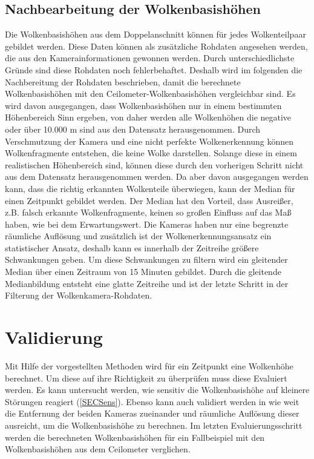 \documentclass[a4paper,11pt,twoside,german]{article}
\newcommand{\absatz}{\smallbreak}
\begin{document}
\subsection{Nachbearbeitung der Wolkenbasishöhen}
\label{SECHeightPost}
Die Wolkenbasishöhen aus dem Doppelanschnitt können für jedes Wolkenteilpaar gebildet werden. Diese Daten können als zusätzliche Rohdaten angesehen werden, die aus den Kamerainformationen gewonnen werden. Durch unterschiedlichste Gründe sind diese Rohdaten noch fehlerbehaftet. Deshalb wird im folgenden die Nachbereitung der Rohdaten beschrieben, damit die berechnete Wolkenbasishöhen mit den Ceilometer-Wolkenbasishöhen vergleichbar sind.\absatz
Es wird davon ausgegangen, dass Wolkenbasishöhen nur in einem bestimmten Höhenbereich Sinn ergeben, von daher werden alle Wolkenhöhen die negative oder über 10.000 m sind aus den Datensatz herausgenommen.\absatz
Durch Verschmutzung der Kamera und eine nicht perfekte Wolkenerkennung können Wolkenfragmente entstehen, die keine Wolke darstellen. Solange diese in einem realistischen Höhenbereich sind, können diese durch den vorherigen Schritt nicht aus dem Datensatz herausgenommen werden. Da aber davon ausgegangen werden kann, dass die richtig erkannten Wolkenteile überwiegen, kann der Median für einen Zeitpunkt gebildet werden. Der Median hat den Vorteil, dass Ausreißer, z.B. falsch erkannte Wolkenfragmente, keinen so großen Einfluss auf das Maß haben, wie bei dem Erwartungswert.\absatz
Die Kameras haben nur eine begrenzte räumliche Auflösung und zusätzlich ist der Wolkenerkennungsansatz ein statistischer Ansatz, deshalb kann es innerhalb der Zeitreihe größere Schwankungen geben. Um diese Schwankungen zu filtern wird ein gleitender Median über einen Zeitraum von 15 Minuten gebildet. Durch die gleitende Medianbildung entsteht eine glatte Zeitreihe und ist der letzte Schritt in der Filterung der Wolkenkamera-Rohdaten.\absatz


\section{Validierung}
\label{SECValidation}
Mit Hilfe der vorgestellten Methoden wird für ein Zeitpunkt eine Wolkenhöhe berechnet. Um diese auf ihre Richtigkeit zu überprüfen muss diese Evaluiert werden. Es kann untersucht werden, wie sensitiv die Wolkenbasishöhe auf kleinere Störungen reagiert (\ref{SECSens}). Ebenso kann auch validiert werden in wie weit die Entfernung der beiden Kameras zueinander und räumliche Auflösung dieser ausreicht, um die Wolkenbasishöhe zu berechnen. Im letzten Evaluierungsschritt werden die berechneten Wolkenbasishöhen für ein Fallbeispiel mit den Wolkenbasishöhen aus dem Ceilometer verglichen.
\end{document}
